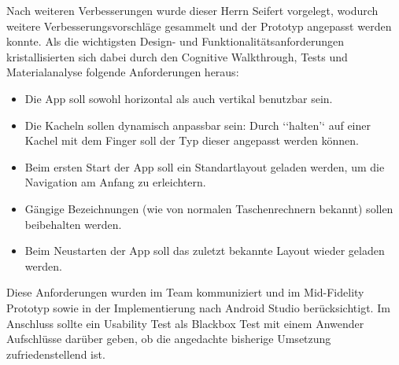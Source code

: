 Nach weiteren Verbesserungen wurde dieser Herrn Seifert vorgelegt, wodurch weitere Verbesserungsvorschläge gesammelt und der Prototyp angepasst werden konnte. 
Als die wichtigsten Design- und Funktionalitätsanforderungen kristallisierten sich dabei durch den Cognitive Walkthrough, Tests und Materialanalyse folgende Anforderungen heraus:
\begin{itemize}
	\item Die App soll sowohl horizontal als auch vertikal benutzbar sein.
	\item Die Kacheln sollen dynamisch anpassbar sein: Durch ‘‘halten’‘ auf einer Kachel mit dem Finger soll der Typ dieser angepasst werden können.
	\item Beim ersten Start der App soll ein Standartlayout geladen werden, um die Navigation am Anfang zu erleichtern.
	\item Gängige Bezeichnungen (wie von normalen Taschenrechnern bekannt) sollen beibehalten werden.
	\item Beim Neustarten der App soll das zuletzt bekannte Layout wieder geladen werden.
\end{itemize}

Diese Anforderungen wurden im Team kommuniziert und im Mid-Fidelity Prototyp sowie in der Implementierung nach Android Studio berücksichtigt. Im Anschluss sollte ein Usability Test als Blackbox Test mit einem Anwender Aufschlüsse darüber geben, ob die angedachte bisherige Umsetzung zufriedenstellend ist.


